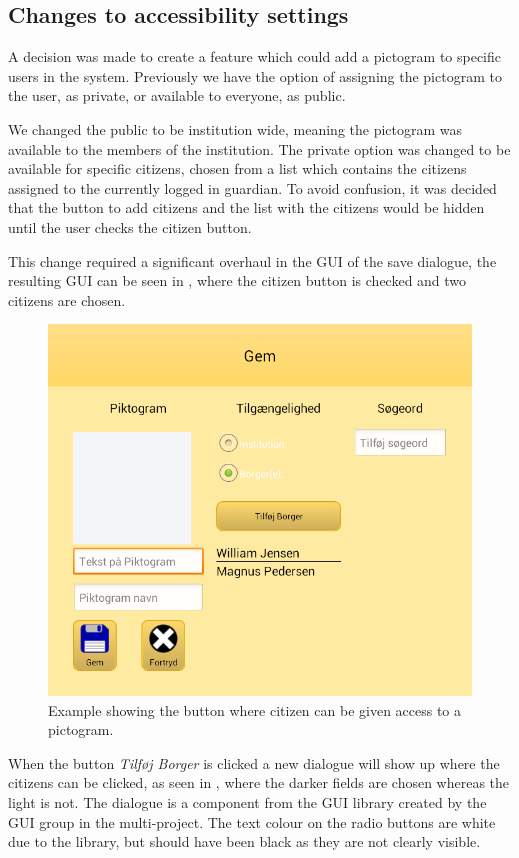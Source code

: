 \subsection{Changes to accessibility settings}
A decision was made to create a feature which could add a pictogram to specific users in the system. 
Previously we have the option of assigning the pictogram to the user, as private, or available to everyone, as public.

We changed the public to be institution wide, meaning the pictogram was available to the members of the institution.
The private option was changed to be available for specific citizens, chosen from a list which contains the citizens assigned to the currently logged in guardian.
To avoid confusion, it was decided that the button to add citizens and the list with the citizens would be hidden until the user checks the citizen button.

This change required a significant overhaul in the GUI of the save dialogue, the resulting GUI can be seen in , where the citizen button is checked and two citizens are chosen.

\begin{figure}[h]
\includegraphics[scale=0.5]{media/sprint4/save_dialog2}
\caption{Example showing the button where citizen can be given access to a pictogram.}
\label{fig:save_dialogue2}
\end{figure}

When the button \textit{Tilføj Borger} is clicked a new dialogue will show up where the citizens can be clicked, as seen in , where the darker fields are chosen whereas the light is not.
The dialogue is a component from the GUI library created by the GUI group in the multi-project.
The text colour on the radio buttons are white due to the library, but should have been black as they are not clearly visible.

